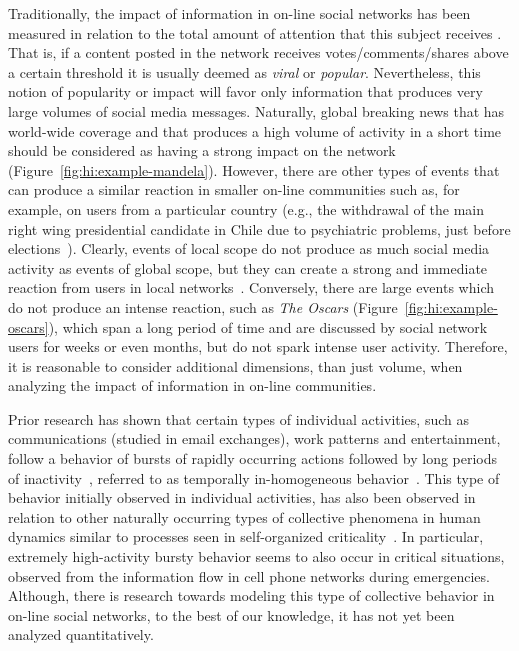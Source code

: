 Traditionally, the impact of information in on-line social networks has been
measured in relation to the total amount of attention that this subject receives
\cite{berger2012makes,iribarren2011branching,guerini2011exploring,mills2012virality,gaugaz2012predicting}.
%
That is, if a content posted in the network receives votes/comments/shares above
a certain threshold it is usually deemed as {\em viral} or {\em popular}.
%
Nevertheless, this notion of popularity or impact will favor only information
that produces very large volumes of social media messages. 
%
Naturally, global breaking news that has world-wide coverage and that produces a
high volume of activity in a short time should be considered as having a strong
impact on the network (Figure~\ref{fig:hi:example-mandela}).  
%
However, there are other types of events that can produce a similar reaction in
smaller on-line communities such as, for example, on users from a particular
country (e.g., the withdrawal of the main right wing presidential candidate in
Chile due to psychiatric problems, just before
elections~\cite{chile_elections}). 
%
Clearly, events of local scope do not produce as much social media activity as
events of global scope, but they can create a strong and immediate reaction from
users in local networks~\cite{ReisBOPKA15}. 
%
Conversely, there are large events which do not produce an intense reaction,
such as {\em The Oscars} (Figure~\ref{fig:hi:example-oscars}), which span a long
period of time and are discussed by social network users for weeks or even
months, but do not spark intense user activity. 
%
Therefore, it is reasonable to consider additional dimensions, than just volume,
when analyzing the impact of information in on-line communities.  

Prior research has shown that certain types of individual activities, such as
communications (studied in email exchanges), work patterns and entertainment,
follow a behavior of bursts of rapidly occurring actions followed by long
periods of inactivity~\cite{barabasi2005origin}, referred to as {temporally
in-homogeneous} behavior~\cite{karsai2012universal}.  
%
This type of behavior initially observed in individual activities, has also been
observed in relation to other naturally occurring types of collective phenomena
in human dynamics similar to processes seen in self-organized
criticality~\cite{karsai2012universal}.  
%
In particular, extremely high-activity bursty behavior seems to also occur in
critical situations, observed from the information flow in cell phone networks
during emergencies\cite{gao2014quantifying}.  
%
Although, there is research towards modeling this type of collective behavior
\cite{yan2013information} in on-line social networks, to the best of our
knowledge, it has not yet been analyzed quantitatively.





